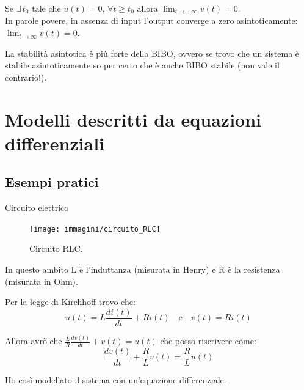 			Se $\exists \, t_0 \text{ tale che } u(t)=0 \text{, } \forall t \ge t_0 \text{ allora } \lim_{t \to +\infty} v(t)=0$.\\
			In parole povere, in assenza di input l'output converge a zero asintoticamente: $\lim_{t \to \infty} v(t)=0$.
			
			\begin{NB}				
			La stabilità asintotica è più forte della BIBO, ovvero se trovo che un sistema è stabile asintoticamente so per certo che è anche BIBO stabile (non vale il contrario!).
			\end{NB}

	
\section{Modelli descritti da equazioni differenziali}

\subsection{Esempi pratici}
\begin{nexample}
	Circuito elettrico
	
		\begin{figure}[H]
			\centering
			\texttt{[image: immagini/circuito\_RLC]}
			\caption{ Circuito RLC. }
			\label{fig: circuito_RLC}
		\end{figure}
	 	In questo ambito L è l'induttanza (misurata in Henry) e R è la resistenza (misurata in Ohm). 
 	
	 	Per la legge di Kirchhoff trovo che: 
	 	\[ u(t) = L \frac{di(t)}{dt} + R i(t) \quad \text{e} \quad v(t) = R i(t) \]
	 	
	 	Allora avrò che $ \frac{L}{R} \frac{dv(t)}{dt} + v(t) = u(t)$ che posso riscrivere come:
	 	  \[ \frac{dv(t)}{dt} + \frac{R}{L} v(t) = \frac{R}{L} u(t) \]
	 	  
	 	Ho così modellato il sistema con un'equazione differenziale.
\end{nexample}

